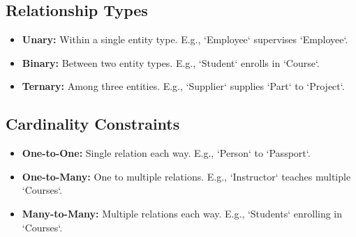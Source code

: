 \vspace{-0.3cm}
\noindent
\subsection*{Relationship Types}
\vspace{-0.1cm}

\begin{itemize}[noitemsep,leftmargin=*]
\leftskip-\dimexpr\leftmargin %
\item[] \textbf{Unary:} Within a single entity type. E.g., `Employee` supervises `Employee`.
\item[] \textbf{Binary:} Between two entity types. E.g., `Student` enrolls in `Course`.
\item[] \textbf{Ternary:} Among three entities. E.g., `Supplier` supplies `Part` to `Project`.
\end{itemize}

\vspace{-0.3cm}
\subsection*{Cardinality Constraints}
\vspace{-0.1cm}

\begin{itemize}[noitemsep,leftmargin=*]
\leftskip-\dimexpr\leftmargin %
\item[] \textbf{One-to-One:} Single relation each way. E.g., `Person` to `Passport`.
\item[] \textbf{One-to-Many:} One to multiple relations. E.g., `Instructor` teaches multiple `Courses`.
\item[] \textbf{Many-to-Many:} Multiple relations each way. E.g., `Students` enrolling in `Courses`.
\end{itemize}
